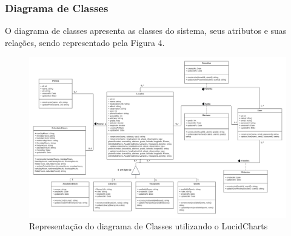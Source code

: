 \subsubsection{Diagrama de Classes}

    O diagrama de classes apresenta as classes do sistema, seus atributos e suas relações, sendo representado pela Figura 4.

    \begin{figure}[h]
        \centering
        \includegraphics[width=1.1\textwidth]{imagens/diagramaDeClasses.png}
        \caption{\scriptsize Representação do diagrama de Classes utilizando o LucidCharts \cite{lucidCharts}}
        \label{fig:diagramaDeClasses}
    \end{figure}